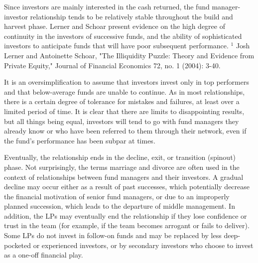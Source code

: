 \documentclass[11pt]{article}
\begin{document}
Since investors are mainly interested in the cash returned, the fund manager-investor relationship tends to be relatively stable throughout the build and harvest phase. Lerner and Schoar present evidence on the high degree of continuity in the investors of successive funds, and the ability of sophisticated investors to anticipate funds that will have poor subsequent performance. ${ }^{1}$ Josh Lerner and Antoinette Schoar, "The Illiquidity Puzzle: Theory and Evidence from Private Equity," Journal of Financial Economics 72, no. 1 (2004): 3-40.

It is an oversimplification to assume that investors invest only in top performers and that below-average funds are unable to continue. As in most relationships, there is a certain degree of tolerance for mistakes and failures, at least over a limited period of time. It is clear that there are limits to disappointing results, but all things being equal, investors will tend to go with fund managers they already know or who have been referred to them through their network, even if the fund's performance has been subpar at times.

Eventually, the relationship ends in the decline, exit, or transition (spinout) phase. Not surprisingly, the terms marriage and divorce are often used in the context of relationships between fund managers and their investors. A gradual decline may occur either as a result of past successes, which potentially decrease the financial motivation of senior fund managers, or due to an improperly planned succession, which leads to the departure of middle management. In addition, the LPs may eventually end the relationship if they lose confidence or trust in the team (for example, if the team becomes arrogant or fails to deliver). Some LPs do not invest in follow-on funds and may be replaced by less deep-pocketed or experienced investors, or by secondary investors who choose to invest as a one-off financial play.
\end{document}
